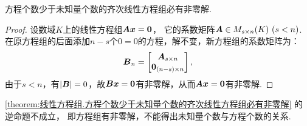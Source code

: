 \begin{corollary}\label{theorem:线性方程组.方程个数少于未知量个数的齐次线性方程组必有非零解}
方程个数少于未知量个数的齐次线性方程组必有非零解.
\begin{proof}
设数域\(K\)上的线性方程组\(\boldsymbol{A} \boldsymbol{x} = \boldsymbol0\)，
它的系数矩阵\(\boldsymbol{A} \in M_{s \times n}(K)\ (s<n)\).
在原方程组的后面添加\(n-s\)个\(0=0\)的方程，解不变，新方程组的系数矩阵为：
\begin{equation*}
	\boldsymbol{B}_n = \begin{bmatrix} \boldsymbol{A}_{s \times n} \\ \boldsymbol0_{(n-s) \times n} \end{bmatrix},
\end{equation*}
由于\(s < n\)，有\(\abs{\boldsymbol{B}} = 0\)，故\(\boldsymbol{B} \boldsymbol{x} = \boldsymbol0\)有非零解，从而\(\boldsymbol{A} \boldsymbol{x} = \boldsymbol0\)有非零解.
\end{proof}
\end{corollary}
\begin{remark}
\cref{theorem:线性方程组.方程个数少于未知量个数的齐次线性方程组必有非零解} 的逆命题不成立，
即方程组有非零解，不能得出未知量个数与方程个数的关系.
\end{remark}
